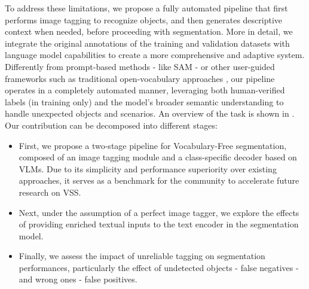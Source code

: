 To address these limitations, we propose a fully automated pipeline that first performs image tagging to recognize objects, and then generates descriptive context when needed, before proceeding with segmentation. More in detail, we integrate the original annotations of the training and validation datasets with language model capabilities to create a more comprehensive and adaptive system. Differently from prompt-based methods - like SAM \cite{kirillov2023segment} - or other user-guided frameworks such as traditional open-vocabulary approaches \cite{cho2024cat,shin2024towards}, our pipeline operates in a completely automated manner, leveraging both human-verified labels (in training only) and the model's broader semantic understanding to handle unexpected objects and scenarios.
An overview of the task is shown in .
Our contribution can be decomposed into different stages:
\begin{itemize}
    \item First, we propose a two-stage pipeline for Vocabulary-Free segmentation, composed of an image tagging module and a class-specific decoder based on VLMs. Due to its simplicity and performance superiority over existing approaches, it serves as a benchmark for the community to accelerate future research on VSS.
    \item Next, under the assumption of a perfect image tagger, we explore the effects of providing enriched textual inputs to the text encoder in the segmentation model.
    \item  Finally, we assess the impact of unreliable tagging on segmentation performances, particularly the effect of undetected objects - false negatives - and wrong ones - false positives.
\end{itemize}
